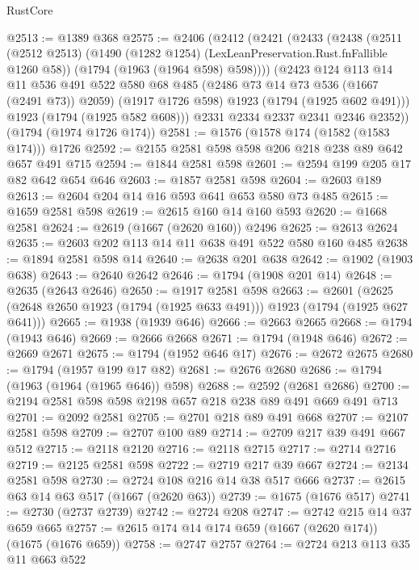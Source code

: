 \begin{lexlean}{RustCore}
\begin{coremodule}
@2513 := @1389 @368
@2575 := @2406
    (@2412
      (@2421
        (@2433
          (@2438
            (@2511
              (@2512 @2513)
              (@1490 (@1282 @1254) (LexLeanPreservation.Rust.fnFallible @1260 @58))
              (@1794 (@1963 (@1964 @598) @598))))
          (@2423
            @124
            @113
            @14
            @11
            @536
            @491
            @522
            @580
            @68
            @485
            (@2486 @73 @14 @73 @536 (@1667 (@2491 @73)) @2059)
            (@1917 @1726 @598)
            @1923
            (@1794 (@1925 @602 @491)))
          @1923
          (@1794 (@1925 @582 @608)))
        @2331
        @2334
        @2337
        @2341
        @2346
        @2352))
    (@1794 (@1974 @1726 @174))
@2581 := @1576 (@1578 @174 (@1582 (@1583 @174))) @1726
@2592 := @2155 @2581 @598 @598 @206 @218 @238 @89 @642 @657 @491 @715
@2594 := @1844 @2581 @598
@2601 := @2594 @199 @205 @17 @82 @642 @654 @646
@2603 := @1857 @2581 @598
@2604 := @2603 @189
@2613 := @2604 @204 @14 @16 @593 @641 @653 @580 @73 @485
@2615 := @1659 @2581 @598
@2619 := @2615 @160 @14 @160 @593
@2620 := @1668 @2581
@2624 := @2619 (@1667 (@2620 @160)) @2496
@2625 := @2613 @2624
@2635 := @2603 @202 @113 @14 @11 @638 @491 @522 @580 @160 @485
@2638 := @1894 @2581 @598 @14
@2640 := @2638 @201 @638
@2642 := @1902 (@1903 @638)
@2643 := @2640 @2642
@2646 := @1794 (@1908 @201 @14)
@2648 := @2635 (@2643 @2646)
@2650 := @1917 @2581 @598
@2663 := @2601 (@2625 (@2648 @2650 @1923 (@1794 (@1925 @633 @491))) @1923 (@1794 (@1925 @627 @641)))
@2665 := @1938 (@1939 @646)
@2666 := @2663 @2665
@2668 := @1794 (@1943 @646)
@2669 := @2666 @2668
@2671 := @1794 (@1948 @646)
@2672 := @2669 @2671
@2675 := @1794 (@1952 @646 @17)
@2676 := @2672 @2675
@2680 := @1794 (@1957 @199 @17 @82)
@2681 := @2676 @2680
@2686 := @1794 (@1963 (@1964 (@1965 @646)) @598)
@2688 := @2592 (@2681 @2686)
@2700 := @2194 @2581 @598 @598 @2198 @657 @218 @238 @89 @491 @669 @491 @713
@2701 := @2092 @2581
@2705 := @2701 @218 @89 @491 @668
@2707 := @2107 @2581 @598
@2709 := @2707 @100 @89
@2714 := @2709 @217 @39 @491 @667 @512
@2715 := @2118 @2120
@2716 := @2118 @2715
@2717 := @2714 @2716
@2719 := @2125 @2581 @598
@2722 := @2719 @217 @39 @667
@2724 := @2134 @2581 @598
@2730 := @2724 @108 @216 @14 @38 @517 @666
@2737 := @2615 @63 @14 @63 @517 (@1667 (@2620 @63))
@2739 := @1675 (@1676 @517)
@2741 := @2730 (@2737 @2739)
@2742 := @2724 @208
@2747 := @2742 @215 @14 @37 @659 @665
@2757 := @2615 @174 @14 @174 @659 (@1667 (@2620 @174)) (@1675 (@1676 @659))
@2758 := @2747 @2757
@2764 := @2724 @213 @113 @35 @11 @663 @522

\end{coremodule}
\end{lexlean}
